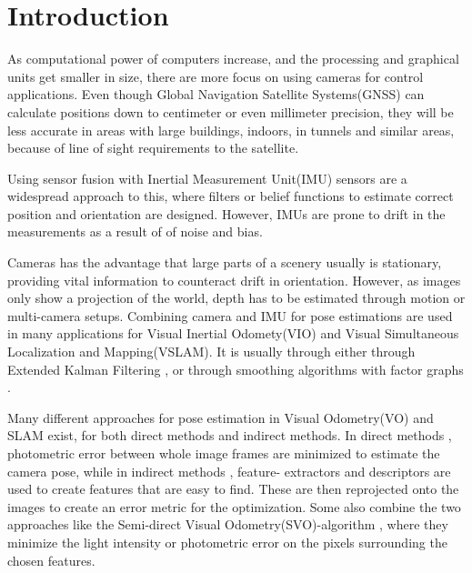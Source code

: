 
\chapter{Introduction} \label{chap:introduction}

As computational power of computers increase, and the processing and graphical units get smaller in size, there are more focus on using cameras for control applications. Even though Global Navigation Satellite Systems(GNSS) can calculate positions down to centimeter or even millimeter precision\cite{GPSaccuracy}, they will be less accurate in areas with large buildings, indoors, in tunnels and similar areas, because of line of sight requirements to the satellite. 

Using sensor fusion with Inertial Measurement Unit(IMU) sensors are a widespread approach to this, where filters or belief functions to estimate correct position and orientation are designed. However, IMUs are prone to drift in the measurements as a result of of noise and bias.

Cameras has the advantage that large parts of a scenery usually is stationary, providing vital information to counteract drift in orientation. However, as images only show a projection of the world, depth has to be estimated through motion or multi-camera setups. Combining camera and IMU for pose estimations are used in many applications for Visual Inertial Odomety(VIO) and Visual Simultaneous Localization and Mapping(VSLAM). It is usually through either through Extended Kalman Filtering \cite{RealTimeKalmannSLAM, HighPrecKalmannVIO, OmniVIOKalman}, or through smoothing algorithms with factor graphs \cite{OnManiIntgrVIO, KeyFrameVIO}.

Many different approaches for pose estimation in Visual Odometry(VO) and SLAM exist, for both direct methods and indirect methods. In direct methods \cite{DTAMdirect, LSDSLAMdirect}, photometric error between whole image frames are minimized to estimate the camera pose, while in indirect methods \cite{ORBSLAMindirect, 2yMarsndirect}, feature- extractors and descriptors are used to create features that are easy to find. These are then reprojected onto the images to create an error metric for the optimization. Some also combine the two approaches like the Semi-direct Visual Odometry(SVO)-algorithm \cite{SVOpaper}, where they minimize the light intensity or photometric error on the pixels surrounding the chosen features.

